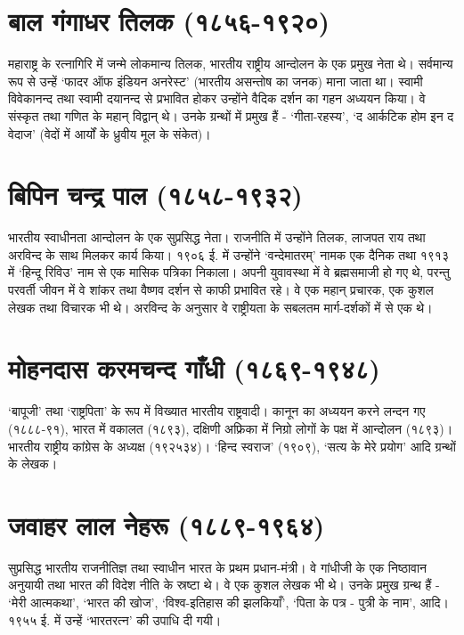 \section*{बाल गंगाधर तिलक (१८५६-१९२०) }

महाराष्ट्र के रत्नागिरि में जन्मे लोकमान्य तिलक, भारतीय राष्ट्रीय आन्दोलन के एक प्रमुख नेता थे। सर्वमान्य रूप से उन्हें ‘फादर ऑफ इंडियन अनरेस्ट’ (भारतीय असन्तोष का जनक) माना जाता था। स्वामी विवेकानन्द तथा स्वामी दयानन्द से प्रभावित होकर उन्होंने वैदिक दर्शन का गहन अध्ययन किया। वे संस्कृत तथा गणित के महान् विद्वान् थे। उनके ग्रन्थों में प्रमुख हैं - ‘गीता-रहस्य’, ‘द आर्कटिक होम इन द वेदाज’ (वेदों में आर्यों के ध्रुवीय मूल के संकेत)। 

\section*{बिपिन चन्द्र पाल (१८५८-१९३२) }

भारतीय स्वाधीनता आन्दोलन के एक सुप्रसिद्ध नेता। राजनीति में उन्होंने तिलक, लाजपत राय तथा अरविन्द के साथ मिलकर कार्य किया। १९०६ ई. में उन्होंने ‘वन्देमातरम्’ नामक एक दैनिक तथा १९१३ में ‘हिन्दू रिविउ’ नाम से एक मासिक पत्रिका निकाला। अपनी युवावस्था में वे ब्रह्मसमाजी हो गए थे, परन्तु परवर्ती जीवन में वे शांकर तथा वैष्णव दर्शन से काफी प्रभावित रहे। वे एक महान् प्रचारक, एक कुशल लेखक तथा विचारक भी थे। अरविन्द के अनुसार वे राष्ट्रीयता के सबलतम मार्ग-दर्शकों में से एक थे। 

\section*{मोहनदास करमचन्द गाँधी (१८६९-१९४८) }

‘बापूजी’ तथा ‘राष्ट्रपिता’ के रूप में विख्यात भारतीय राष्ट्रवादी। कानून का अध्ययन करने लन्दन गए (१८८८-९१), भारत में वकालत (१८९३), दक्षिणी अफ्रिका में निग्रो लोगों के पक्ष में आन्दोलन (१८९३)। भारतीय राष्ट्रीय कांग्रेस के अध्यक्ष (१९२५३४)। ‘हिन्द स्वराज’ (१९०९), ‘सत्य के मेरे प्रयोग’ आदि ग्रन्थों के लेखक। 

\section*{जवाहर लाल नेहरू (१८८९-१९६४) }

सुप्रसिद्ध भारतीय राजनीतिज्ञ तथा स्वाधीन भारत के प्रथम प्रधान-मंत्री। वे गांधीजी के एक निष्ठावान अनुयायी तथा भारत की विदेश नीति के स्रष्टा थे। वे एक कुशल लेखक भी थे। उनके प्रमुख ग्रन्थ हैं - ‘मेरी आत्मकथा’, ‘भारत की खोज’, ‘विश्व-इतिहास की झलकियाँ’, ‘पिता के पत्र - पुत्री के नाम’, आदि। १९५५ ई. में उन्हें ‘भारतरत्न’ की उपाधि दी गयी। 

